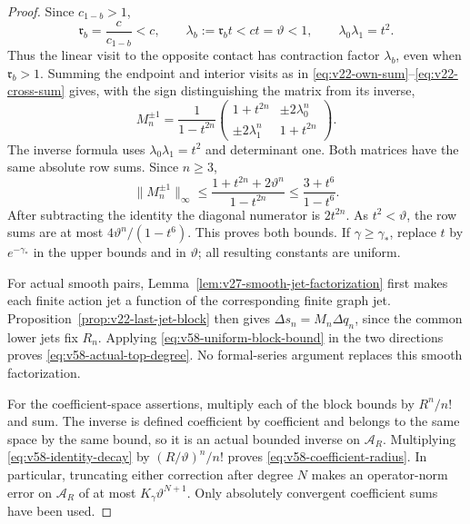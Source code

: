 \begin{proof}
Since $c_{1-b}>1$,
\begin{equation}\label{eq:v58-admissible-contraction}
 \mathfrak r_b=\frac{c}{c_{1-b}}<c,
 \qquad \lambda_b:=\mathfrak r_bt<ct=\vartheta<1,
 \qquad \lambda_0\lambda_1=t^2.
\end{equation}
Thus the linear visit to the opposite contact has contraction factor
$\lambda_b$, even when $\mathfrak r_b>1$.  Summing the endpoint and
interior visits as in \eqref{eq:v22-own-sum}--\eqref{eq:v22-cross-sum}
gives, with the sign distinguishing the matrix from its inverse,
\begin{equation}\label{eq:v58-explicit-signed-blocks}
 M_n^{\pm1}=\frac1{1-t^{2n}}
       \begin{pmatrix}1+t^{2n}&\pm2\lambda_0^n\\
                       \pm2\lambda_1^n&1+t^{2n}\end{pmatrix}.
\end{equation}
The inverse formula uses $\lambda_0\lambda_1=t^2$ and determinant one.
Both matrices have the same absolute row sums.  Since $n\ge3$,
\[
 \|M_n^{\pm1}\|_\infty
 \le \frac{1+t^{2n}+2\vartheta^n}{1-t^{2n}}
 \le \frac{3+t^6}{1-t^6}.
\]
After subtracting the identity the diagonal numerator is $2t^{2n}$.
As $t^2<\vartheta$, the row sums are at most
$4\vartheta^n/(1-t^6)$.  This proves both bounds.  If
$\gamma\ge\gamma_*$, replace $t$ by $e^{-\gamma_*}$ in the upper
bounds and in $\vartheta$; all resulting constants are uniform.

For actual smooth pairs, Lemma~\ref{lem:v27-smooth-jet-factorization}
first makes each finite action jet a function of the corresponding
finite graph jet.  Proposition~\ref{prop:v22-last-jet-block} then gives
$\Delta s_n=M_n\Delta q_n$, since the common lower jets fix $R_n$.
Applying \eqref{eq:v58-uniform-block-bound} in the two directions proves
\eqref{eq:v58-actual-top-degree}.  No formal-series argument replaces
this smooth factorization.

For the coefficient-space assertions, multiply each of the block bounds
by $R^n/n!$ and sum.  The inverse is defined coefficient by coefficient
and belongs to the same space by the same bound, so it is an actual
bounded inverse on $\mathcal A_R$.  Multiplying
\eqref{eq:v58-identity-decay} by $(R/\vartheta)^n/n!$ proves
\eqref{eq:v58-coefficient-radius}.  In particular, truncating either
correction after degree $N$ makes an operator-norm error on
$\mathcal A_R$ of at most $K_\gamma\vartheta^{N+1}$.  Only absolutely
convergent coefficient sums have been used.
\end{proof}

